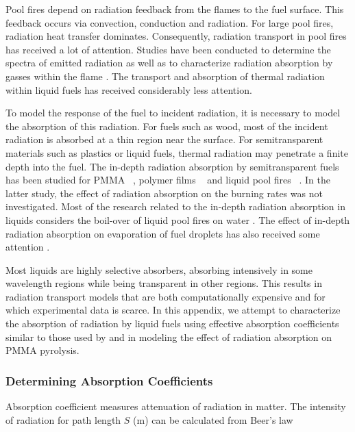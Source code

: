 Pool fires depend on radiation feedback from the flames to the fuel surface. This feedback occurs via convection, conduction and radiation. For large pool fires, radiation heat transfer dominates. Consequently, radiation transport in pool fires has received a lot of attention. Studies have been conducted to determine the spectra of emitted radiation \cite{Suo-Anttila:PCT2009} as well as to characterize radiation absorption by gasses within the flame \cite{Wakatsuki:CST2008}. The transport and absorption of thermal radiation within liquid fuels has received considerably less attention.

To model the response of the fuel to incident radiation, it is necessary to model the absorption of this radiation. For fuels such as wood, most of the incident radiation is absorbed at a thin region near the surface. For semitransparent materials such as plastics or liquid fuels, thermal radiation may penetrate a finite depth into the fuel. The in-depth radiation absorption by semitransparent fuels has been studied for PMMA ~\cite{Stoliarov:CF2009}, polymer films ~\cite{Tsilingiris:ECM2003} and liquid pool fires ~\cite{Suo-Anttila:PCT2009}. In the latter study, the effect of radiation absorption on the burning rates was not investigated. Most of the research related to the in-depth radiation absorption in liquids considers the boil-over of liquid pool fires on water \cite{Broeckmann:JLPPI1995}. The effect of in-depth radiation absorption on evaporation of fuel droplets has also received some attention \cite{Sazhin:IJHMT2004b}.

Most liquids are highly selective absorbers, absorbing intensively in some wavelength regions while being transparent in other regions. This results in radiation transport models that are both computationally expensive and for which experimental data is scarce. In this appendix, we attempt to characterize the absorption of radiation by liquid fuels using effective absorption coefficients similar to those used by \cite{Madhav:IJMP1995} and \cite{Manohar:JHT1995} in modeling the effect of radiation absorption on PMMA pyrolysis.

\subsubsection{Determining Absorption Coefficients}

Absorption coefficient measures attenuation of radiation in matter.  The intensity of radiation for path length $S$ (m) can be calculated from Beer's law

